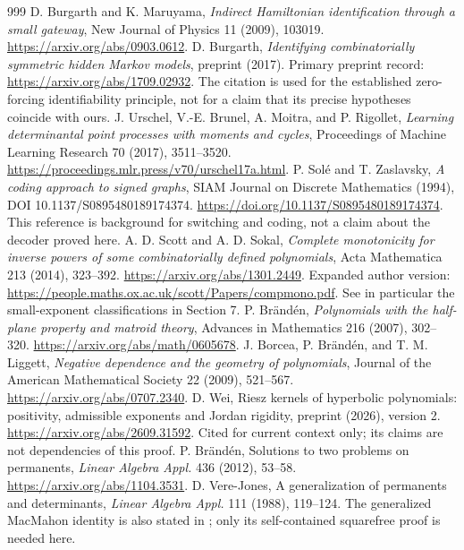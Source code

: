 \documentclass[11pt,a4paper]{article}
\theoremstyle{definition}\newtheorem{definition}[theorem]{Definition}
\theoremstyle{remark}\newtheorem{remark}[theorem]{Remark}
\numberwithin{equation}{section}
\begin{document}
\clearpage
{}
\begingroup\small
\begin{thebibliography}{999}
 D. Burgarth and K. Maruyama, \emph{Indirect Hamiltonian identification through a small gateway}, New Journal of Physics 11 (2009), 103019. \url{https://arxiv.org/abs/0903.0612}.
 D. Burgarth, \emph{Identifying combinatorially symmetric hidden Markov models}, preprint (2017). Primary preprint record: \url{https://arxiv.org/abs/1709.02932}. The citation is used for the established zero-forcing identifiability principle, not for a claim that its precise hypotheses coincide with ours.
 J. Urschel, V.-E. Brunel, A. Moitra, and P. Rigollet, \emph{Learning determinantal point processes with moments and cycles}, Proceedings of Machine Learning Research 70 (2017), 3511--3520. \url{https://proceedings.mlr.press/v70/urschel17a.html}.
 P. Sol\'e and T. Zaslavsky, \emph{A coding approach to signed graphs}, SIAM Journal on Discrete Mathematics (1994), DOI 10.1137/S0895480189174374. \url{https://doi.org/10.1137/S0895480189174374}. This reference is background for switching and coding, not a claim about the decoder proved here.
 A. D. Scott and A. D. Sokal, \emph{Complete monotonicity for inverse powers of some combinatorially defined polynomials}, Acta Mathematica 213 (2014), 323--392. \url{https://arxiv.org/abs/1301.2449}. Expanded author version: \url{https://people.maths.ox.ac.uk/scott/Papers/compmono.pdf}. See in particular the small-exponent classifications in Section 7.
 P. Br\"and\'en, \emph{Polynomials with the half-plane property and matroid theory}, Advances in Mathematics 216 (2007), 302--320. \url{https://arxiv.org/abs/math/0605678}.
 J. Borcea, P. Br\"and\'en, and T. M. Liggett, \emph{Negative dependence and the geometry of polynomials}, Journal of the American Mathematical Society 22 (2009), 521--567. \url{https://arxiv.org/abs/0707.2340}.
 D. Wei, Riesz kernels of hyperbolic polynomials: positivity, admissible exponents and Jordan rigidity, preprint (2026), version 2. \url{https://arxiv.org/abs/2609.31592}. Cited for current context only; its claims are not dependencies of this proof.
 P. Br\"and\'en, Solutions to two problems on permanents, \emph{Linear Algebra Appl.} 436 (2012), 53--58. \url{https://arxiv.org/abs/1104.3531}.
 D. Vere-Jones, A generalization of permanents and determinants, \emph{Linear Algebra Appl.} 111 (1988), 119--124. The generalized MacMahon identity is also stated in \cite[Theorem 2.4]{ref009}; only its self-contained squarefree proof is needed here.

\end{thebibliography}
\end{document}

